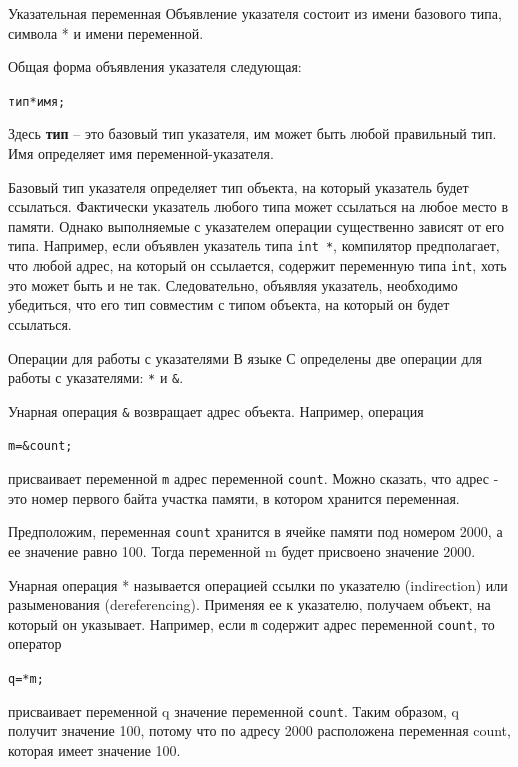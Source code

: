 \documentclass{beamer}
\begin{document}
\begin{frame}{Указательная переменная}
    Объявление указателя состоит из имени базового типа, символа * и имени переменной.
    
    \medskip Общая форма объявления указателя следующая:
    
    \begin{alltt}
    тип *имя;
    \end{alltt}
    
    Здесь \textbf{тип} -- это базовый тип указателя, им может быть любой правильный тип. Имя определяет имя переменной-указателя.
    
    \medskip
    Базовый тип указателя определяет тип объекта, на который указатель будет ссылаться. Фактически указатель любого типа может ссылаться на любое место в памяти. Однако выполняемые с указателем операции существенно зависят от его типа. Например, если объявлен указатель типа \texttt{int *}, компилятор предполагает, что любой адрес, на который он ссылается,
    содержит переменную типа \texttt{int}, хоть это может быть и не так. Следовательно, объявляя указатель, необходимо убедиться, что его тип совместим с типом объекта, на который он будет ссылаться.
\end{frame}

\begin{frame}{Операции для работы с указателями}
    В языке С определены две операции для работы с указателями: \texttt{*} и \texttt{\&}.
    
    Унарная операция \texttt{&} возвращает адрес объекта. Например, операция
    \begin{alltt}
    m = \&count;
    \end{alltt}
    присваивает переменной \texttt{m} адрес переменной \texttt{count}. Можно сказать, что адрес - это номер первого байта участка памяти, в котором хранится переменная. 
    
    \medskip Предположим, переменная \texttt{count} хранится в ячейке памяти под номером 2000, а ее значение равно 100. Тогда переменной m будет присвоено значение 2000.
    
    \medskip Унарная операция * называется операцией ссылки по указателю (indirection) или разыменования (dereferencing). Применяя ее к указателю, получаем объект, на который он указывает. Например, если \texttt{m} содержит адрес переменной \texttt{count}, то оператор
    \begin{alltt}
    q = *m;
    \end{alltt}
    присваивает переменной q значение переменной \texttt{count}. Таким образом, q получит значение 100, потому что по адресу 2000 расположена переменная count, которая имеет значение 100.
\end{frame}
\end{document}
